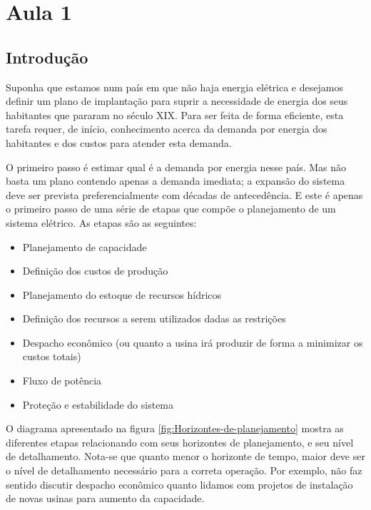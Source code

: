 \section{Aula 1}

\subsection{Introdução}


Suponha que estamos num país em que não haja energia elétrica e desejamos
definir um plano de implantação para suprir a necessidade de energia
dos seus habitantes que pararam no século XIX. Para ser feita de forma eficiente, esta tarefa requer, de início, conhecimento acerca da demanda por energia dos habitantes e dos custos para atender esta demanda.

O primeiro passo é estimar qual é a demanda por energia nesse país.
Mas não basta um plano contendo apenas a demanda imediata; a expansão do sistema deve ser prevista preferencialmente com décadas de antecedência. E este é apenas o primeiro passo de uma série de etapas que compõe o planejamento de um sistema elétrico. As etapas são as seguintes: 
\begin{itemize}
\item Planejamento de capacidade
\item Definição dos custos de produção
\item Planejamento do estoque de recursos hídricos
\item Definição dos recursos a serem utilizados dadas as restrições
\item Despacho econômico (ou quanto a usina irá produzir de forma a minimizar os custos totais)
\item Fluxo de potência
\item Proteção e estabilidade do sistema
\end{itemize}

O diagrama apresentado na figura \ref{fig:Horizontes-de-planejamento} mostra as diferentes etapas relacionando com seus horizontes de planejamento, e seu nível de detalhamento. Nota-se que quanto menor o horizonte de tempo, maior deve ser o nível de detalhamento necessário para a correta operação. Por exemplo, não faz sentido discutir despacho econômico quanto lidamos com projetos de instalação de novas usinas para aumento da capacidade.

